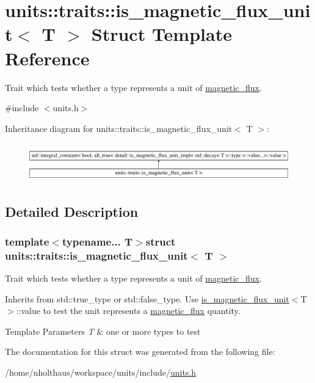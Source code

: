 \hypertarget{structunits_1_1traits_1_1is__magnetic__flux__unit}{}\section{units\+:\+:traits\+:\+:is\+\_\+magnetic\+\_\+flux\+\_\+unit$<$ T $>$ Struct Template Reference}
\label{structunits_1_1traits_1_1is__magnetic__flux__unit}


Trait which tests whether a type represents a unit of \hyperlink{namespaceunits_1_1magnetic__flux}{magnetic\+\_\+flux}.  




{\ttfamily \#include $<$units.\+h$>$}

Inheritance diagram for units\+:\+:traits\+:\+:is\+\_\+magnetic\+\_\+flux\+\_\+unit$<$ T $>$\+:\begin{figure}[H]
\begin{center}
\leavevmode
\includegraphics[height=1.674140cm]{structunits_1_1traits_1_1is__magnetic__flux__unit}
\end{center}
\end{figure}


\subsection{Detailed Description}
\subsubsection*{template$<$typename... T$>$struct units\+::traits\+::is\+\_\+magnetic\+\_\+flux\+\_\+unit$<$ T $>$}

Trait which tests whether a type represents a unit of \hyperlink{namespaceunits_1_1magnetic__flux}{magnetic\+\_\+flux}. 

Inherits from {\ttfamily std\+::true\+\_\+type} or {\ttfamily std\+::false\+\_\+type}. Use {\ttfamily \hyperlink{structunits_1_1traits_1_1is__magnetic__flux__unit}{is\+\_\+magnetic\+\_\+flux\+\_\+unit}$<$T$>$\+::value} to test the unit represents a \hyperlink{namespaceunits_1_1magnetic__flux}{magnetic\+\_\+flux} quantity. 
\begin{DoxyTemplParams}{Template Parameters}
{\em T} & one or more types to test \\
\hline
\end{DoxyTemplParams}


The documentation for this struct was generated from the following file\+:\begin{DoxyCompactItemize}
\item 
/home/nholthaus/workspace/units/include/\hyperlink{units_8h}{units.\+h}\end{DoxyCompactItemize}
